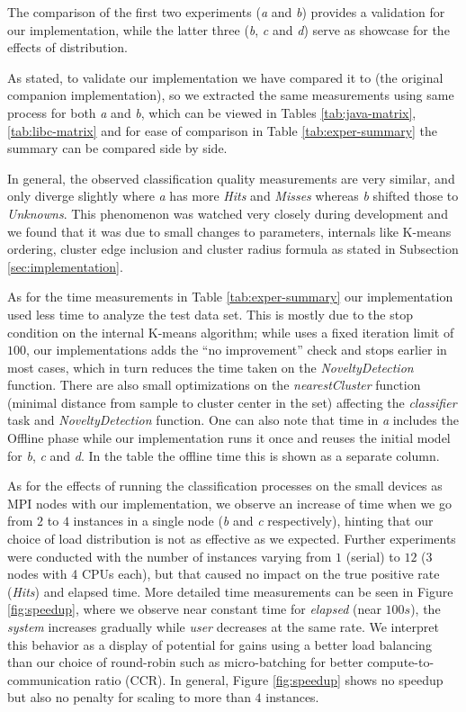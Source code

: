 The comparison of the first two experiments (\emph{a} and \emph{b}) provides a
validation for our implementation, while the latter three (\emph{b}, \emph{c}
and \emph{d}) serve as showcase for the effects of distribution.

As stated, to validate our implementation we have compared it to 
(the original \minas companion implementation), so we extracted the same measurements
using same process for both \emph{a} and \emph{b}, which can be viewed in
Tables \ref{tab:java-matrix}, \ref{tab:libc-matrix} and for ease of comparison
in Table \ref{tab:exper-summary} the summary can be compared side by side.

In general, the observed classification quality measurements are very similar,
and only diverge slightly where \emph{a} has more \emph{Hits} and \emph{Misses}
whereas \emph{b} shifted those to \emph{Unknowns}.
This phenomenon was watched very closely during development and we found that it was due to
small changes to \minas parameters, \minas internals like K-means ordering,
cluster edge inclusion and cluster radius formula as stated in
Subsection \ref{sec:implementation}.

As for the time measurements in Table \ref{tab:exper-summary}
our implementation used less time to analyze the test data set.
This is mostly due to 
the stop condition
on the internal K-means algorithm; while  uses a fixed iteration
limit of $100$, our implementations adds the ``no improvement'' check
and stops earlier in most cases, which in turn reduces the time taken
on the \emph{NoveltyDetection} function.
There are also small optimizations on the \emph{nearestCluster} function
(minimal distance from sample to cluster center in the set)
affecting the \emph{classifier} task and \emph{NoveltyDetection} function.
One can also note that  time in \emph{a} includes the Offline phase while our
implementation runs it once and reuses the initial model for \emph{b}, \emph{c}
and \emph{d}. In the table the offline time this is shown as a separate column.

As for the effects of running the classification processes on the small devices as MPI nodes with our implementation, we observe
an increase of time when we go from $2$ to $4$ instances in a single node
(\emph{b} and \emph{c} respectively), hinting that our choice of load
distribution is not as effective as we expected.
Further experiments were conducted with the number of instances varying from $1$ (serial) to
$12$ (3 nodes with 4 CPUs each), but that caused no impact on the true positive rate (\emph{Hits}) and elapsed time.
More detailed time measurements can be seen in Figure \ref{fig:speedup},
where we observe near constant time for \emph{elapsed} (near $100s$),
the \emph{system} increases gradually while \emph{user} decreases at the same rate.
We interpret this behavior as a display of potential for gains using a better
load balancing than our choice of round-robin such as micro-batching for better
compute-to-communication ratio (CCR).
In general, Figure \ref{fig:speedup} shows no speedup but also no penalty for
scaling to more than $4$ instances.

